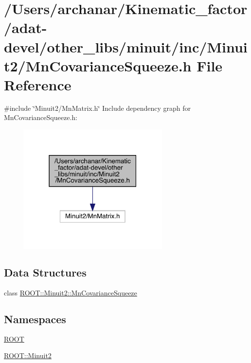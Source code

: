 \hypertarget{adat-devel_2other__libs_2minuit_2inc_2Minuit2_2MnCovarianceSqueeze_8h}{}\section{/\+Users/archanar/\+Kinematic\+\_\+factor/adat-\/devel/other\+\_\+libs/minuit/inc/\+Minuit2/\+Mn\+Covariance\+Squeeze.h File Reference}
\label{adat-devel_2other__libs_2minuit_2inc_2Minuit2_2MnCovarianceSqueeze_8h}
{\ttfamily \#include \char`\"{}Minuit2/\+Mn\+Matrix.\+h\char`\"{}}\newline
Include dependency graph for Mn\+Covariance\+Squeeze.\+h\+:
\nopagebreak
\begin{figure}[H]
\begin{center}
\leavevmode
\includegraphics[width=214pt]{de/df9/adat-devel_2other__libs_2minuit_2inc_2Minuit2_2MnCovarianceSqueeze_8h__incl}
\end{center}
\end{figure}
\subsection*{Data Structures}
\begin{DoxyCompactItemize}
\item 
class \mbox{\hyperlink{classROOT_1_1Minuit2_1_1MnCovarianceSqueeze}{R\+O\+O\+T\+::\+Minuit2\+::\+Mn\+Covariance\+Squeeze}}
\end{DoxyCompactItemize}
\subsection*{Namespaces}
\begin{DoxyCompactItemize}
\item 
 \mbox{\hyperlink{namespaceROOT}{R\+O\+OT}}
\item 
 \mbox{\hyperlink{namespaceROOT_1_1Minuit2}{R\+O\+O\+T\+::\+Minuit2}}
\end{DoxyCompactItemize}
